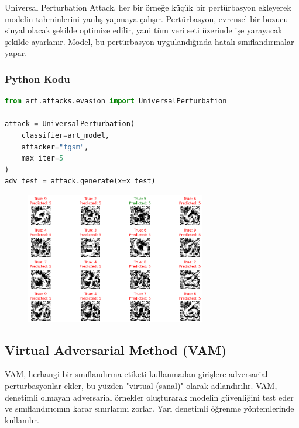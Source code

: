 Universal Perturbation Attack, her bir örneğe küçük bir pertürbasyon ekleyerek modelin tahminlerini yanlış yapmaya çalışır. Pertürbasyon, evrensel bir bozucu sinyal olacak şekilde optimize edilir, yani tüm veri seti üzerinde işe yarayacak şekilde ayarlanır. Model, bu pertürbasyon uygulandığında hatalı sınıflandırmalar yapar.

\subsubsection{Python Kodu}

\begin{lstlisting}[language=Python]
from art.attacks.evasion import UniversalPerturbation

attack = UniversalPerturbation(
    classifier=art_model, 
    attacker="fgsm", 
    max_iter=5
)
adv_test = attack.generate(x=x_test)
\end{lstlisting}

\begin{figure}[h]
    \centering
    \includegraphics[width=0.7\textwidth]{images/universal_perturbation_example.png}
    \caption{}
\end{figure}

\newpage

\subsection{Virtual Adversarial Method (VAM)}

VAM, herhangi bir sınıflandırma etiketi kullanmadan girişlere adversarial perturbasyonlar ekler, bu yüzden "virtual (sanal)" olarak adlandırılır. VAM, denetimli olmayan adversarial örnekler oluşturarak modelin güvenliğini test eder ve sınıflandırıcının karar sınırlarını zorlar. Yarı denetimli öğrenme yöntemlerinde kullanılır.

\newpage

